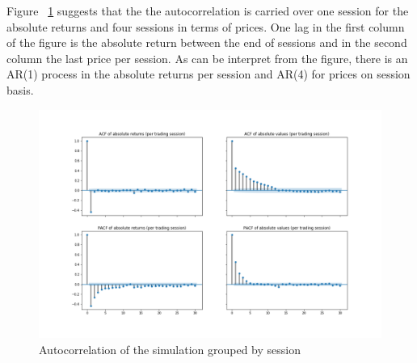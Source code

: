 Figure ~\ref{fig:basic_autocorr_per_session} suggests that the the autocorrelation is carried over one
session for the absolute returns and four sessions in terms of prices. One lag in the first column of the 
figure is the absolute return between the end of sessions and in the second column the last price per session. 
As can be interpret from the figure, there is an AR(1) process in the absolute returns per session and AR(4) 
for prices on session basis.

\begin{figure}
    \includegraphics[width=\linewidth]{plots/basic_autocorrelation.png}
    \caption{Autocorrelation of the simulation grouped by session}
    \label{fig:basic_autocorr_per_session}
\end{figure}



